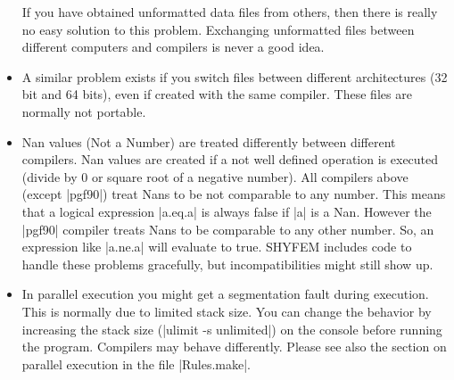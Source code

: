 \begin{itemize}
If you have obtained unformatted data files from others, then there is
really no easy solution to this problem. Exchanging unformatted files
between different computers and compilers is never a good idea.

\item A similar problem exists if you switch files between different
architectures (32 bit and 64 bits), even if created with the same
compiler. These files are normally not portable.

\item Nan values (Not a Number) are treated differently between different
compilers. Nan values are created if a not well defined operation is
executed (divide by 0 or square root of a negative number). All compilers
above (except |pgf90|) treat Nans to be not comparable to any number.
This means that a logical expression |a.eq.a| is always false if |a|
is a Nan. However the |pgf90| compiler treats Nans to be comparable
to any other number. So, an expression like |a.ne.a| will evaluate to
true. SHYFEM includes code to handle these problems gracefully, but
incompatibilities might still show up.

\item In parallel execution you might get a segmentation fault during
execution. This is normally due to limited stack size. You can change
the behavior by increasing the stack size (|ulimit -s unlimited|)
on the console before running the program. Compilers may behave
differently. Please see also the section on parallel execution in the
file |Rules.make|.

\end{itemize}







